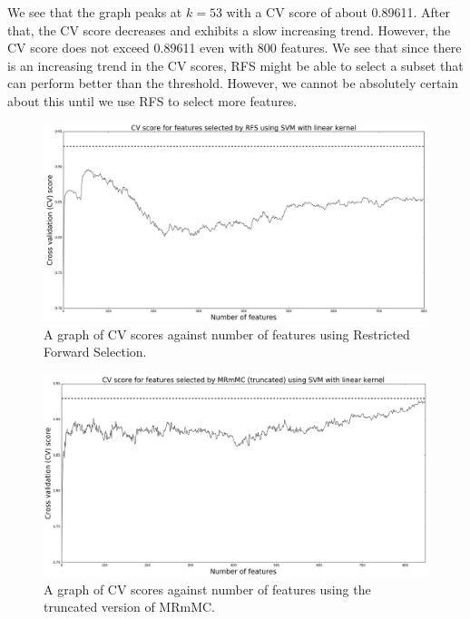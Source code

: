 \documentclass[12pt, twoside, a4paper]{report}
\begin{document}
We see that the graph peaks at $k=53$ with a CV score of about 0.89611. After that, the CV score decreases and exhibits a slow increasing trend. However, the CV score does not exceed 0.89611 even with 800 features. We see that since there is an increasing trend in the CV scores, RFS might be able to select a subset that can perform better than the threshold. However, we cannot be absolutely certain about this until we use RFS to select more features.

\begin{figure}
\centering
\includegraphics[width=\textwidth]{images/rfs_linear_800.jpeg}
\caption{A graph of CV scores against number of features using Restricted Forward Selection.}
\label{body:rfs_graph}
\end{figure}

\begin{figure}
\centering
\includegraphics[width=\textwidth]{images/mrmmc_trun_linear_847.jpeg}
\caption{A graph of CV scores against number of features using the truncated version of MRmMC.}
\label{body:mrmmc_trun}
\end{figure}
\end{document}
